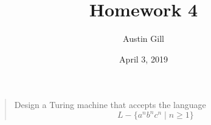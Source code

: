 \documentclass{article}
\title{Homework 4}
\author{Austin Gill}
\date{April 3, 2019}
\begin{document}
\maketitle

\section{}
\begin{quote}
    Design a Turing machine that accepts the language \[L - \{a^n b^n c^n \mid n \geq 1\} \]
\end{quote}
\end{document}
